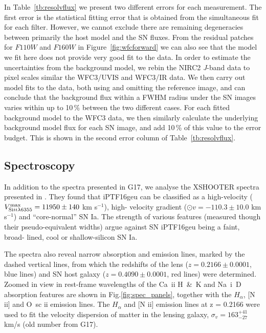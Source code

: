 \documentclass[a4paper,fleqn,usenatbib]{mnras}
\newcommand{\geu}{iPTF16geu\xspace}
\newcommand{\scipap}{G17\xspace}
\newcommand{\sn}{SN\xspace}
\newcommand{\wfc}{WFC3\xspace}
\newcommand{\wfcuvis}{WFC3/UVIS\xspace}
\newcommand{\wfcir}{WFC3/IR\xspace}
\newcommand{\jband}{{\it J}\xspace}
\newcommand{\hstj}{$F110W$\xspace}
\newcommand{\hsth}{$F160W$\xspace}
\begin{document}
In Table~\ref{tb:resolvflux} we present two different errors for each measurement.  The first error is the statistical fitting error that is obtained 
from the simultaneous fit for each filter.  However, we cannot exclude there are remaining degeneracies between primarily the host model
and the \sn fluxes.  From the residual patches for \hstj and \hsth in Figure~\ref{fig:wfcforward} we can also see that the model we fit
here does not provide very good fit to the data.  In order to estimate the uncertainties from the background model, we rebin  the 
NIRC2 \jband-band data to pixel scales similar the \wfcuvis and \wfcir data.  We then carry out model fits to the data, both using and 
omitting the reference image, and can conclude that the background flux within a FWHM radius under the \sn images varies 
within up to 10\,\% between the two different cases.  For each fitted background model to the \wfc data, we then similarly calculate the
underlying background model flux for each \sn image, and add 10\,\% of this value to the error budget.  This is shown in the second error
column of Table~\ref{tb:resolvflux}.

\subsection{Spectroscopy}
\label{ssec-spectroscopy}
In addition to the spectra presented in \scipap, we analyse the XSHOOTER spectra presented in \citet{2018MNRAS.473.4257C}. They found that \geu can be classified as a high-velocity ($V_{{\rm Si}{\sc ii} \lambda6355}^{\rm max} = 11950 \pm 140$ km s$^{-1}$), high- velocity gradient ($\odot{v} = -110.3 \pm 10.0$ km s$^{-1}$) and “core-normal” SN Ia. The strength of various features (measured though their pseudo-equivalent widths) argue against SN \geu being a faint, broad- lined, cool or shallow-silicon SN Ia.

The spectra also reveal narrow absorption and emission lines, marked by the dashed vertical lines, from which the redshifts of the lens ($z = 0.2166 \pm 0.0001$, blue lines) and SN host galaxy ($z = 0.4090 \pm 0.0001$, red lines) were determined. Zoomed in view in rest-frame wavelengths of the Ca~{\sc ii} H~\&~K and Na~{\sc i}~D absorption features are shown in Fig.\ref{fig:spec_panels}, together with the $H_{\alpha}$, [N {\sc ii}] and O~{sc ii} emission lines. The $H_{\alpha}$ and [N {\sc ii}] emission lines at z = 0.2166 were used to fit the velocity dispersion of matter in the lensing galaxy, $\sigma_v = 163^{+41}_{-27}$ km/s (old number from \scipap).
\end{document}
